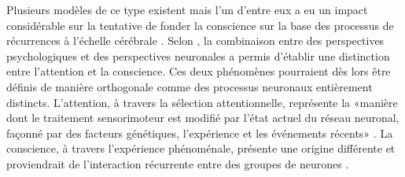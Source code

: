 Plusieurs modèles de ce type existent mais l'un d'entre eux a eu un impact considérable sur la tentative de fonder la conscience sur la base des processus de récurrences à l'échelle cérébrale \citep{lamme2000distinct,lamme2003visual, lamme2006towards}. 
Selon \cite{lamme2003visual}, la combinaison entre des perspectives psychologiques et des perspectives neuronales a permis d'établir une distinction entre l'attention et la conscience. 
Ces deux phénomènes pourraient dès lors être définis de manière orthogonale comme des processus neuronaux entièrement distincts. 
L'attention, à travers la sélection attentionnelle, représente la «manière dont le traitement sensorimoteur est modifié par l'état actuel du réseau neuronal, façonné par des facteurs génétiques, l'expérience et les événements récents» \citep{lamme2003visual}. 
La conscience, à travers l'expérience phénoménale, présente une origine différente et proviendrait de l'interaction récurrente entre des groupes de neurones \citep{lamme2000distinct, lamme2003visual, lamme2006towards}. 


